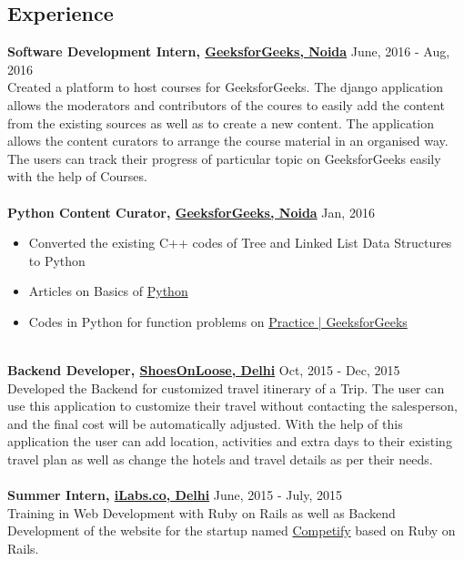 \documentclass[margin, centered]{res}
\begin{document}
\begin{resume}
\section{Experience}
\textbf{Software Development Intern, \href{http://courses.geeksforgeeks.org}{GeeksforGeeks, Noida}} \hfill June, 2016 - Aug, 2016\\
Created a platform to host courses for GeeksforGeeks. The django application allows the moderators and contributors of the coures to easily add the content from the existing sources as well as to create a new content. The application allows the content curators to arrange the course material in an organised way. The users can track their progress of particular topic on GeeksforGeeks easily with the help of Courses.  \\
\\
\textbf{Python Content Curator, \href{http://geeksforgeeks.org}{GeeksforGeeks, Noida}} \hfill Jan, 2016\\
\begin{itemize}
  \item Converted the existing C++ codes of Tree and Linked List Data Structures to Python
  \item Articles on Basics of  \href {http://www.geeksforgeeks.org/python/}{Python}
  \item Codes in Python for function problems on \href {http://practice.geeksforgeeks.org}{Practice | GeeksforGeeks}
\end{itemize}
\\
\textbf{Backend Developer, \href {http://shoesonloose.com/}{ShoesOnLoose, Delhi}} \hfill Oct, 2015 - Dec, 2015 \\
Developed the Backend for customized travel itinerary of a Trip. The user can use this application to customize their travel without contacting the salesperson, and the final cost will be automatically adjusted. With the help of this application the user can add location, activities and extra days to their existing travel plan as well as change the hotels and travel details as per their needs. \\
\\
\textbf{Summer Intern, \href{http://www.ilabs.co}{iLabs.co, Delhi}} \hfill June, 2015 - July, 2015 \\
Training in Web Development with Ruby on Rails as well as Backend Development of the website for the startup named \href {http://competifyin.herokuapp.com} {Competify} based on Ruby on Rails. \\

\end{resume}
\end{document}
